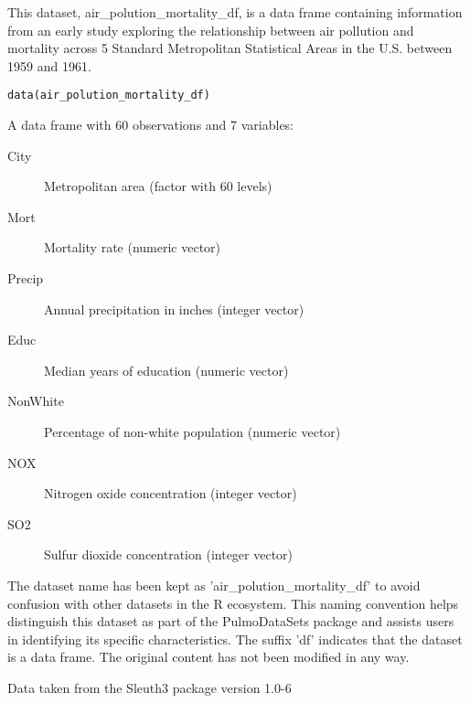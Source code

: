 \documentclass[a4paper]{book}
\begin{document}
%
\begin{Description}
This dataset, air\_polution\_mortality\_df, is a data frame containing information from
an early study exploring the relationship between air pollution and mortality across
5 Standard Metropolitan Statistical Areas in the U.S. between 1959 and 1961.
\end{Description}
%
\begin{Usage}
\begin{verbatim}
data(air_polution_mortality_df)
\end{verbatim}
\end{Usage}
%
\begin{Format}
A data frame with 60 observations and 7 variables:
\begin{description}

\item[City] Metropolitan area (factor with 60 levels)
\item[Mort] Mortality rate (numeric vector)
\item[Precip] Annual precipitation in inches (integer vector)
\item[Educ] Median years of education (numeric vector)
\item[NonWhite] Percentage of non-white population (numeric vector)
\item[NOX] Nitrogen oxide concentration (integer vector)
\item[SO2] Sulfur dioxide concentration (integer vector)

\end{description}

\end{Format}
%
\begin{Details}
The dataset name has been kept as 'air\_polution\_mortality\_df' to avoid confusion with other datasets
in the R ecosystem. This naming convention helps distinguish this dataset as part of the
PulmoDataSets package and assists users in identifying its specific characteristics.
The suffix 'df' indicates that the dataset is a data frame. The original content has not been modified
in any way.
\end{Details}
%
\begin{Source}
Data taken from the Sleuth3 package version 1.0-6
\end{Source}
\end{document}
